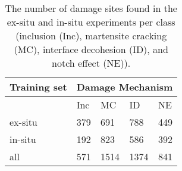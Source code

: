 \begin{table}[H]
\begin{center}
\begin{tabular}{@{} *5l @{}} \toprule[2pt]
Training set &  \multicolumn{4}{c}{Damage Mechanism}   \\\midrule
 & Inc & MC & ID & NE   \\ 
ex-situ  & 379 & 691 & 788 & 449\\ 
in-situ  & 192 & 823 & 586 & 392 \\ \bottomrule
all  & 571 & 1514 & 1374 & 841\\\bottomrule[2pt]

\end{tabular}
 \caption{The number of damage sites found in the ex-situ and in-situ experiments per class (inclusion (Inc), martensite cracking (MC), interface decohesion (ID), and notch effect (NE)).}
 \label{tab:Dataset}
\end{center}
\end{table}